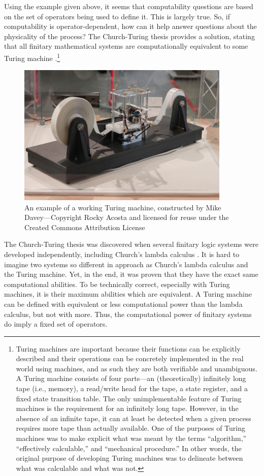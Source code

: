 Using the example given above, it seems that computability questions are based on the set of operators being used to define it.  This is largely true.  So, if computability is operator-dependent, how can it help answer questions about the physicality of the process?  The Church-Turing thesis provides a solution, stating that all finitary mathematical systems are computationally equivalent to some Turing machine \citep{turing1937,turing1939}.\footnote{Turing machines are important because their functions can be explicitly described and their operations can be concretely implemented in the real world using machines, and as such they are both verifiable and unambiguous.  A Turing machine consists of four parts---an (theoretically) infinitely long tape (i.e., memory), a read/write head for the tape, a state register, and a fixed state transition table.  The only unimplementable feature of Turing machines is the requirement for an infinitely long tape.  However, in the absence of an infinite tape, it can at least be detected when a given process requires more tape than actually available.  One of the purposes of Turing machines was to make explicit what was meant by the terms ``algorithm,'' ``effectively calculable,'' and ``mechanical procedure.''  In other words, the original purpose of developing Turing machines was to delineate between what was calculable and what was not.}

\begin{figure}[H]
\centering
\includegraphics[width=4in]{TuringMachineDavey.jpg}
\caption{An example of a working Turing machine, constructed by Mike Davey---Copyright  Rocky Acosta and licensed for reuse under the Created Commons Attribution License}
\end{figure}

The Church-Turing thesis was discovered when several finitary logic systems were developed independently, including Church's lambda calculus \citep{church1936,turing1937}.  It is hard to imagine two systems so different in approach as Church's lambda calculus and the Turing machine.  Yet, in the end, it was proven that they have the exact same computational abilities.  To be technically correct, especially with Turing machines, it is their maximum abilities which are equivalent.  A Turing machine can be defined with equivalent or less computational power than the lambda calculus, but not with more.  Thus, the computational power of finitary systems do imply a fixed set of operators.  

